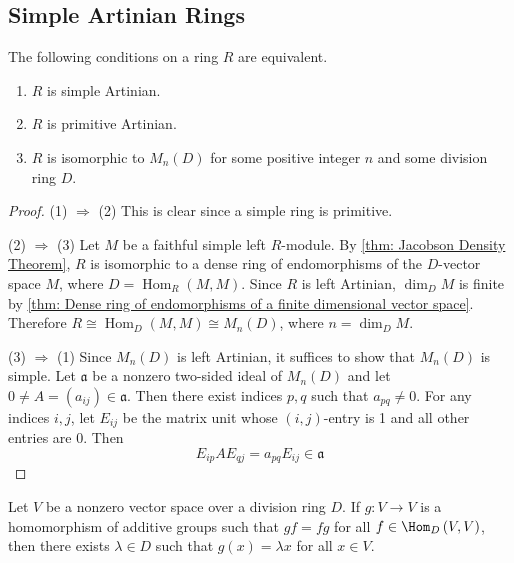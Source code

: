 \subsection{Simple Artinian Rings}
\begin{theorem}
    \label{thm: Wedderburn-Artin theorem}
    The following conditions on a ring $R$ are equivalent.
    \begin{enumerate}
        \item
              $R$ is simple Artinian.

        \item
              $R$ is primitive Artinian.

        \item
              $R$ is isomorphic to $M_n\left(D\right)$ for some positive integer $n$ and some division ring $D$.
    \end{enumerate}
    \begin{proof}
        (1) $\Rightarrow$ (2)
        This is clear since a simple ring is primitive.

        (2) $\Rightarrow$ (3)
        Let $M$ be a faithful simple left $R$-module.
        By \cref{thm: Jacobson Density Theorem}, $R$ is isomorphic to a dense ring of endomorphisms of the $D$-vector space $M$, where $D=\operatorname{Hom}_R(M, M)$.
        Since $R$ is left Artinian, $\operatorname{dim}_D M$ is finite by \cref{thm: Dense ring of endomorphisms of a finite dimensional vector space}.
        Therefore $R \cong \operatorname{Hom}_D(M, M) \cong M_n\left(D\right)$, where $n=\operatorname{dim}_D M$.

        (3) $\Rightarrow$ (1)
        Since $M_n\left(D\right)$ is left Artinian, it suffices to show that $M_n\left(D\right)$ is simple.
        Let $\mathfrak{a}$ be a nonzero two-sided ideal of $M_n\left(D\right)$ and let $0 \neq A=\left(a_{i j}\right) \in \mathfrak{a}$.
        Then there exist indices $p, q$ such that $a_{p q} \neq 0$.
        For any indices $i, j$, let $E_{i j}$ be the matrix unit whose $(i, j)$-entry is 1 and all other entries are 0.
        Then
        \begin{equation*}
            E_{i p} A E_{q j}=a
            _{p q} E_{i j} \in \mathfrak{a}
        \end{equation*}
    \end{proof}
\end{theorem}

\begin{lemma}
    \label{lem: }
    Let $V$ be a nonzero vector space over a division ring $D$.
    If $g: V \rightarrow V$ is a homomorphism of additive groups such that $gf=fg$ for all $f \in \Hom_{D}\left( V,V \right)$, then there exists $\lambda \in D$ such that $g(x)=\lambda x$ for all $x\in V$.
\end{lemma}


